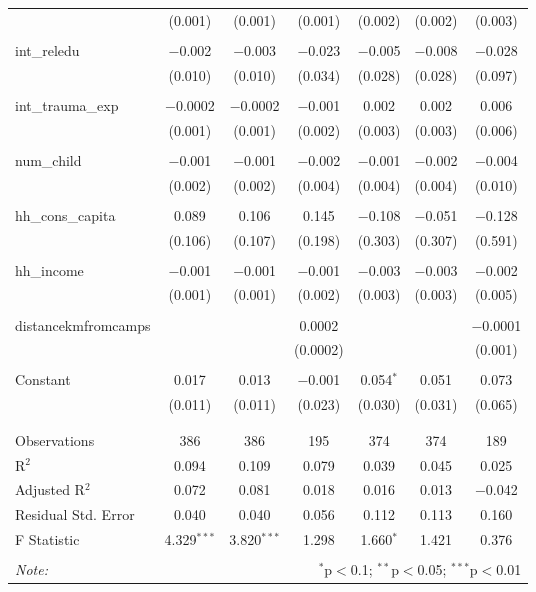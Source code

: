 \begin{table}[H]
\begin{tabular}{@{\extracolsep{4pt}}lcccccc}
  & (0.001) & (0.001) & (0.001) & (0.002) & (0.002) & (0.003) \\ 
  & & & & & & \\ 
 int\_reledu & $-$0.002 & $-$0.003 & $-$0.023 & $-$0.005 & $-$0.008 & $-$0.028 \\ 
  & (0.010) & (0.010) & (0.034) & (0.028) & (0.028) & (0.097) \\ 
  & & & & & & \\ 
 int\_trauma\_exp & $-$0.0002 & $-$0.0002 & $-$0.001 & 0.002 & 0.002 & 0.006 \\ 
  & (0.001) & (0.001) & (0.002) & (0.003) & (0.003) & (0.006) \\ 
  & & & & & & \\ 
 num\_child & $-$0.001 & $-$0.001 & $-$0.002 & $-$0.001 & $-$0.002 & $-$0.004 \\ 
  & (0.002) & (0.002) & (0.004) & (0.004) & (0.004) & (0.010) \\ 
  & & & & & & \\ 
 hh\_cons\_capita & 0.089 & 0.106 & 0.145 & $-$0.108 & $-$0.051 & $-$0.128 \\ 
  & (0.106) & (0.107) & (0.198) & (0.303) & (0.307) & (0.591) \\ 
  & & & & & & \\ 
 hh\_income & $-$0.001 & $-$0.001 & $-$0.001 & $-$0.003 & $-$0.003 & $-$0.002 \\ 
  & (0.001) & (0.001) & (0.002) & (0.003) & (0.003) & (0.005) \\ 
  & & & & & & \\ 
 distancekmfromcamps &  &  & 0.0002 &  &  & $-$0.0001 \\ 
  &  &  & (0.0002) &  &  & (0.001) \\ 
  & & & & & & \\ 
 Constant & 0.017 & 0.013 & $-$0.001 & 0.054$^{*}$ & 0.051 & 0.073 \\ 
  & (0.011) & (0.011) & (0.023) & (0.030) & (0.031) & (0.065) \\ 
  & & & & & & \\ 
\hline \\[-1.8ex] 
Observations & 386 & 386 & 195 & 374 & 374 & 189 \\ 
R$^{2}$ & 0.094 & 0.109 & 0.079 & 0.039 & 0.045 & 0.025 \\ 
Adjusted R$^{2}$ & 0.072 & 0.081 & 0.018 & 0.016 & 0.013 & $-$0.042 \\ 
Residual Std. Error & 0.040 & 0.040 & 0.056 & 0.112 & 0.113 & 0.160 \\ 
F Statistic & 4.329$^{***}$ & 3.820$^{***}$ & 1.298 & 1.660$^{*}$ & 1.421 & 0.376 \\ 
\hline 
\hline \\[-1.8ex] 
\textit{Note:}  & \multicolumn{6}{r}{$^{*}$p$<$0.1; $^{**}$p$<$0.05; $^{***}$p$<$0.01} \\ 
\end{tabular} 
\end{table} 
